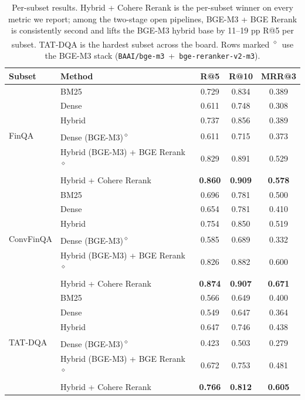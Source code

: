 \documentclass{article}
\begin{document}
\begin{table}[!t]
\centering
\small
\begin{tabular}{llccc}
\toprule
\textbf{Subset} & \textbf{Method} & \textbf{R@5} & \textbf{R@10} & \textbf{MRR@3} \\
\midrule
\multirow{6}{*}{FinQA}
  & BM25    & 0.729 & 0.834 & 0.389 \\
  & Dense   & 0.611 & 0.748 & 0.308 \\
  & Hybrid  & 0.737 & 0.856 & 0.389 \\
  & Dense (BGE-M3)\textsuperscript{$\diamond$}    & 0.611 & 0.715 & 0.373 \\
  & Hybrid (BGE-M3) + BGE Rerank\textsuperscript{$\diamond$} & 0.829 & 0.891 & 0.529 \\
  & Hybrid + Cohere Rerank & \textbf{0.860} & \textbf{0.909} & \textbf{0.578} \\
\midrule
\multirow{6}{*}{ConvFinQA}
  & BM25    & 0.696 & 0.781 & 0.500 \\
  & Dense   & 0.654 & 0.781 & 0.410 \\
  & Hybrid  & 0.754 & 0.850 & 0.519 \\
  & Dense (BGE-M3)\textsuperscript{$\diamond$}    & 0.585 & 0.689 & 0.332 \\
  & Hybrid (BGE-M3) + BGE Rerank\textsuperscript{$\diamond$} & 0.826 & 0.882 & 0.600 \\
  & Hybrid + Cohere Rerank & \textbf{0.874} & \textbf{0.907} & \textbf{0.671} \\
\midrule
\multirow{6}{*}{TAT-DQA}
  & BM25    & 0.566 & 0.649 & 0.400 \\
  & Dense   & 0.549 & 0.647 & 0.364 \\
  & Hybrid  & 0.647 & 0.746 & 0.438 \\
  & Dense (BGE-M3)\textsuperscript{$\diamond$}    & 0.423 & 0.503 & 0.279 \\
  & Hybrid (BGE-M3) + BGE Rerank\textsuperscript{$\diamond$} & 0.672 & 0.753 & 0.481 \\
  & Hybrid + Cohere Rerank & \textbf{0.766} & \textbf{0.812} & \textbf{0.605} \\
\bottomrule
\end{tabular}
\vspace{4pt}
\caption{Per-subset results. Hybrid + Cohere Rerank is the per-subset winner on every metric we report; among the two-stage open pipelines, BGE-M3 + BGE Rerank is consistently second and lifts the BGE-M3 hybrid base by 11--19 pp R@5 per subset. TAT-DQA is the hardest subset across the board. Rows marked \textsuperscript{$\diamond$}~use the BGE-M3 stack (\texttt{BAAI/bge-m3}~+~\texttt{bge-reranker-v2-m3}).}
\label{tab:subset_results}
\end{table}
\end{document}
